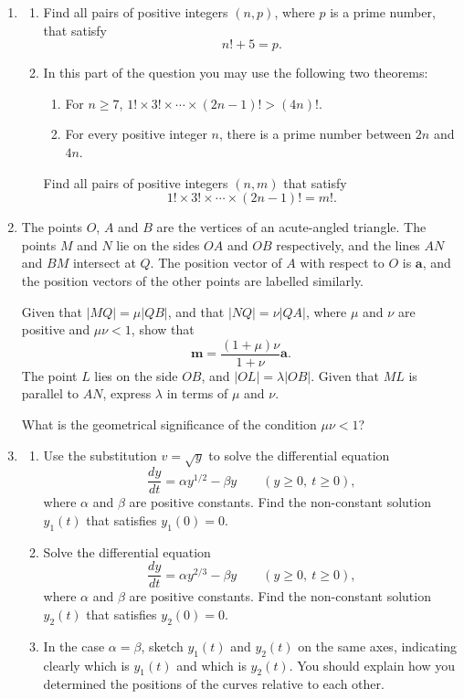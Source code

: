 \documentclass[12pt]{article}
\begin{document}
\begin{enumerate}
\item
\begin{enumerate}
\item Find all pairs of positive integers $(n,p)$, where $p$ is a prime number, that satisfy
\[
n!+5=p.
\]
\item In this part of the question you may use the following two theorems:
\begin{enumerate}[label=\arabic*.]
\item For $n\geq 7$, $1!\times 3!\times \cdots \times (2n-1)!>(4n)!$.
\item For every positive integer $n$, there is a prime number between $2n$ and $4n$.
\end{enumerate}
Find all pairs of positive integers $(n,m)$ that satisfy
\[
1!\times 3!\times \cdots \times (2n-1)!=m!.
\]
\end{enumerate}

\item The points $O$, $A$ and $B$ are the vertices of an acute-angled triangle. The points $M$ and $N$ lie on the sides $OA$ and $OB$ respectively, and the lines $AN$ and $BM$ intersect at $Q$. The position vector of $A$ with respect to $O$ is $\mathbf{a}$, and the position vectors of the other points are labelled similarly.

Given that $|MQ|=\mu |QB|$, and that $|NQ|=\nu |QA|$, where $\mu$ and $\nu$ are positive and $\mu\nu<1$, show that
\[
\mathbf{m}=\frac{(1+\mu)\nu}{1+\nu}\mathbf{a}.
\]
The point $L$ lies on the side $OB$, and $|OL|=\lambda |OB|$. Given that $ML$ is parallel to $AN$, express $\lambda$ in terms of $\mu$ and $\nu$.

What is the geometrical significance of the condition $\mu\nu<1$?

\item
\begin{enumerate}
\item Use the substitution $v=\sqrt{y}$ to solve the differential equation
\[
\frac{dy}{dt}=\alpha y^{1/2}-\beta y \qquad (y\geq 0,\ t\geq 0),
\]
where $\alpha$ and $\beta$ are positive constants. Find the non-constant solution $y_1(t)$ that satisfies $y_1(0)=0$.
\item Solve the differential equation
\[
\frac{dy}{dt}=\alpha y^{2/3}-\beta y \qquad (y\geq 0,\ t\geq 0),
\]
where $\alpha$ and $\beta$ are positive constants. Find the non-constant solution $y_2(t)$ that satisfies $y_2(0)=0$.
\item In the case $\alpha=\beta$, sketch $y_1(t)$ and $y_2(t)$ on the same axes, indicating clearly which is $y_1(t)$ and which is $y_2(t)$. You should explain how you determined the positions of the curves relative to each other.
\end{enumerate}


\end{enumerate}
\end{document}
